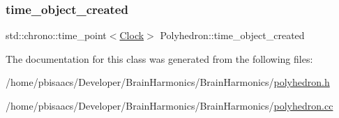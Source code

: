 \mbox{\label{classPolyhedron_a59ae1bf10fa368663a38f3fab34534ca}} 
\subsubsection{\texorpdfstring{time\+\_\+object\+\_\+created}{time\_object\_created}}
{\footnotesize\ttfamily std\+::chrono\+::time\+\_\+point$<$\mbox{\hyperlink{universe_8h_a0ef8d951d1ca5ab3cfaf7ab4c7a6fd80}{Clock}}$>$ Polyhedron\+::time\+\_\+object\+\_\+created\hspace{0.3cm}{\ttfamily [private]}}



The documentation for this class was generated from the following files\+:\begin{DoxyCompactItemize}
\item 
/home/pbisaacs/\+Developer/\+Brain\+Harmonics/\+Brain\+Harmonics/\mbox{\hyperlink{polyhedron_8h}{polyhedron.\+h}}\item 
/home/pbisaacs/\+Developer/\+Brain\+Harmonics/\+Brain\+Harmonics/\mbox{\hyperlink{polyhedron_8cc}{polyhedron.\+cc}}\end{DoxyCompactItemize}

